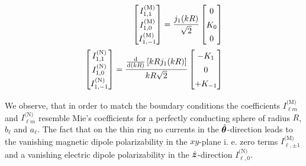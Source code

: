 \begin{align}
\left[
\renewcommand\arraystretch{1.4}\begin{matrix}
I_{1,1}^\text{(M)} \\
I_{1,0}^\text{(M)} \\ 
I_{1,-1}^\text{(M)}
\end{matrix} \right]=
\frac{j_1(kR)}{\sqrt{2}} \left[ 
\renewcommand\arraystretch{1.4}\begin{matrix}
0 \\ K_0 \\ 0
\end{matrix}
\right]
\\
\left[
\renewcommand\arraystretch{1.4}\begin{matrix}
I_{1,1}^\text{(N)} \\
I_{1,0}^\text{(N)} \\ 
I_{1,-1}^\text{(N)}
\end{matrix} \right] =  \frac{\frac{\rd}{\rd (kR)}\left[kR j_1(kR)\right]}{kR\sqrt{2}} 
\left[
\renewcommand\arraystretch{1.4}\begin{matrix}
-K_1\\0\\+K_{-1}
\end{matrix}
\right]
\end{align}

We observe, that in order to match the boundary conditions the coefficients $I_{\ell m}^\text{(M)}$ and $I_{\ell m}^\text{(N)}$ resemble Mie's coefficients for a perfectly conducting sphere of radius $R$, $b_\ell$ and $a_\ell$. 
The fact that on the thin ring no currents in the $\hat{\bm{\theta}}$-direction leads to the vanishing magnetic dipole polarizability in the $xy$-plane i. e. zero terms $I_{\ell, \pm 1}^\text{(M)}$ and a vanishing electric dipole polarizability in the $\hat{\bm{z}}$-direction $I_{\ell, 0}^\text{(N)}$.


